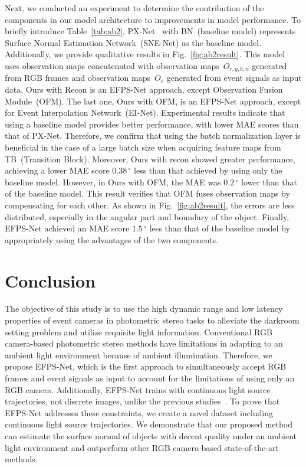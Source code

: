 \documentclass[preprint,12pt,authoryear]{elsarticle}
\begin{document}
Next, we conducted an experiment to determine the contribution of the components in our model architecture to improvements in model performance. To briefly introduce Table~\ref{tab:ab2}, PX-Net~\citep{logothetis2021px} with BN~(baseline model) represents Surface Normal Estimation Network~(SNE-Net) as the baseline model. Additionally, we provide qualitative results in Fig.~\ref{fig:ab2result}. This model uses observation maps concatenated with observation maps~$O_{r,g,b,n}$ generated from RGB frames and observation maps~$O_{e}$ generated from event signals as input data. Ours with Recon is an EFPS-Net approach, except Observation Fusion Module~(OFM). The last one, Ours with OFM, is an EFPS-Net approach, except for Event Interpolation Network~(EI-Net). Experimental results indicate that using a baseline model provides better performance, with lower MAE scores than that of PX-Net. Therefore, we confirm that using the batch normalization layer is beneficial in the case of a large batch size when acquiring feature maps from TB~(Transition Block). Moreover, Ours with recon showed greater performance, achieving a lower MAE score $0.38\,^{\circ}$ less than that achieved by using only the baseline model. However, in Ours with OFM, the MAE was $0.2\,^{\circ}$ lower than that of the baseline model. This result verifies that OFM fuses observation maps by compensating for each other. As shown in Fig.~\ref{fig:ab2result}, the errors are less distributed, especially in the angular part and boundary of the object. Finally, EFPS-Net achieved an MAE score $1.5\,^{\circ}$ less than that of the baseline model by appropriately using the advantages of the two components.

\section{Conclusion}
The objective of this study is to use the high dynamic range and low latency properties of event cameras in photometric stereo tasks to alleviate the darkroom setting problem and utilize requisite light information. Conventional RGB camera-based photometric stereo methods have limitations in adapting to an ambient light environment because of ambient illumination. Therefore, we propose EFPS-Net, which is the first approach to simultaneously accept RGB frames and event signals as input to account for the limitations of using only an RGB camera. Additionally, EFPS-Net trains with continuous light source trajectories, not discrete images, unlike the previous studies~\citep{santo2017deep,ikehata2018cnn,chen2018ps,logothetis2021px}. To prove that EFPS-Net addresses these constraints, we create a novel dataset including continuous light source trajectories. We demonstrate that our proposed method can estimate the surface normal of objects with decent quality under an ambient light environment and outperform other RGB camera-based state-of-the-art methods. %
\end{document}
